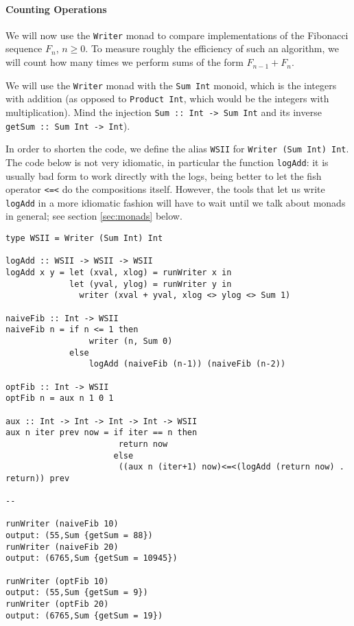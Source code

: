 \documentclass[11	pt]{article}
\theoremstyle{nonumberplain}
\newcommand*\lsin{\lstinline}
\begin{document}
\paragraph{Counting Operations}
We will now use the \lsin|Writer| monad to compare implementations of the Fibonacci sequence $F_n$, $n \geq 0$. To measure roughly the efficiency of such an algorithm, we will count how many times we perform sums of the form $F_{n-1} + F_n$.

We will use the \lsin|Writer| monad with the \lsin|Sum Int| monoid, which is the integers with addition (as opposed to \lsin|Product Int|, which would be the integers with multiplication). Mind the injection \lsin|Sum :: Int -> Sum Int| and its inverse \lsin|getSum :: Sum Int -> Int|).

In order to shorten the code, we define the alias \lsin|WSII| for \lsin|Writer (Sum Int) Int|. The code below is not very idiomatic, in particular the function \lsin|logAdd|: it is usually bad form to work directly with the logs, being better to let the fish operator \lsin|<=<| do the compositions itself. However, the tools that let us write \lsin|logAdd| in a more idiomatic fashion will have to wait until we talk about monads in general; see section \ref{sec:monads} below.

\begin{lstlisting}
type WSII = Writer (Sum Int) Int

logAdd :: WSII -> WSII -> WSII
logAdd x y = let (xval, xlog) = runWriter x in
             let (yval, ylog) = runWriter y in
               writer (xval + yval, xlog <> ylog <> Sum 1)

naiveFib :: Int -> WSII
naiveFib n = if n <= 1 then
                 writer (n, Sum 0)
             else
                 logAdd (naiveFib (n-1)) (naiveFib (n-2))

optFib :: Int -> WSII
optFib n = aux n 1 0 1

aux :: Int -> Int -> Int -> Int -> WSII
aux n iter prev now = if iter == n then
                       return now
                      else
                       ((aux n (iter+1) now)<=<(logAdd (return now) . return)) prev
                        
--

runWriter (naiveFib 10)
output: (55,Sum {getSum = 88})
runWriter (naiveFib 20)
output: (6765,Sum {getSum = 10945})

runWriter (optFib 10)
output: (55,Sum {getSum = 9})
runWriter (optFib 20)
output: (6765,Sum {getSum = 19})
\end{lstlisting}
\end{document}
